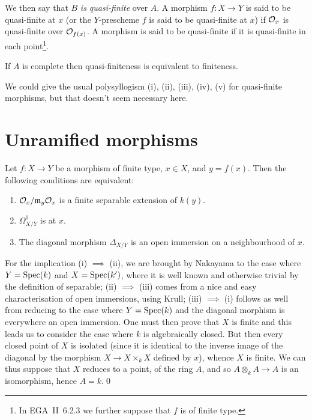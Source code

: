 We then say that $B$ \emph{is quasi-finite} over $A$.
A morphism $f\colon X\to Y$ is said to be quasi-finite at $x$ (or the $Y$-prescheme $f$ is said to be quasi-finite at $x$) if $\mathcal{O}_x$ is quasi-finite over $\mathcal{O}_{f(x)}$.
\completelyunsure
A morphism is said to be quasi-finite if it is quasi-finite in each point\footnote{In EGA~II~6.2.3 we further suppose that $f$ is of finite type.}.

\begin{cor}
    If $A$ is complete then quasi-finiteness is equivalent to finiteness.
\end{cor}

We could give the usual polysyllogism (i), (ii), (iii), (iv), (v) for quasi-finite morphisms, but that doesn't seem necessary here.


\section{Unramified morphisms}

\begin{prop}
    Let $f\colon X\to Y$ be a morphism of finite type, $x\in X$, and $y=f(x)$.
    Then the following conditions are equivalent:
    \begin{enumerate}[\normalfont(i)]
        \item $\mathcal{O}_x/\mathfrak{m}_y\mathcal{O}_x$ is a finite separable extension of $k(y)$.
        \item $\Omega_{X/Y}^1$ is  at $x$.
        \item The diagonal morphism $\Delta_{X/Y}$ is an open immersion on a neighbourhood of $x$.
    \end{enumerate}
\end{prop}

For the implication (i) $\implies$ (ii), we are brought by Nakayama to the case where $Y=\operatorname{Spec}(k)$ and $X=\operatorname{Spec}(k')$, where it is well known and otherwise trivial by the definition of separable; (ii) $\implies$ (iii) comes from a nice and easy characterisation of open immersions, using Krull; (iii) $\implies$ (i) follows as well from reducing to the case where $Y=\operatorname{Spec}(k)$ and the diagonal morphism is everywhere an open immersion.
One must then prove that $X$ is finite \completelyunsure and this leads us to consider the case where $k$ is algebraically closed.
But then every closed point of $X$ is isolated (since it is identical to the inverse image of the diagonal by the morphism $X\to X\times_k X$ defined by $x$), whence $X$ is finite.
We can thus suppose that $X$ reduces to a point, of the ring $A$, and so $A\otimes_k A\to A$ is an isomorphism, hence $A=k$.\qed


